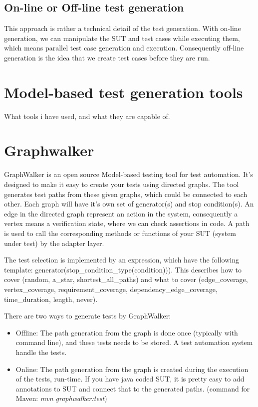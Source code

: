 \subsection{On-line or Off-line test generation}
This approach is rather a technical detail of the test generation. With on-line generation, we can manipulate the SUT and test cases while executing them, which means parallel test case generation and execution. Consequently off-line generation is the idea that we create test cases before they are run.

\section{Model-based test generation tools}
What tools i have used, and what they are capable of.

\section{Graphwalker}

GraphWalker is an open source Model-based testing tool for test automation. It's designed to make it easy to create your tests using directed graphs. The tool generates test paths from these given graphs, which could be connected to each other. Each graph will have it's own set of generator(s) and stop condition(s).  An edge in the directed graph represent an action in the system, consequently a vertex means a verification state, where we can check assertions in code. A path is used to call the corresponding methods or functions of your SUT (system under test) by the adapter layer. 

The test selection is implemented by an expression, which have the following template: generator(stop\_condition\_type(condition))). This describes how to cover (random, a\_star, shortest\_all\_paths) and what to cover (edge\_coverage, vertex\_coverage, requirement\_coverage, dependency\_edge\_coverage, time\_duration, length, never).



There are two ways to generate tests by GraphWalker:
\begin{itemize}
	\item Offline: The path generation from the graph is done once (typically with command line), and these tests needs to be stored. A test automation system handle the tests. 
	\item Online: The path generation from the graph is created during the execution of the tests, run-time. If you have java coded SUT, it is pretty easy to add annotations to SUT and connect that to the generated paths. (command for Maven: \textit{mvn graphwalker:test})
\end{itemize}

